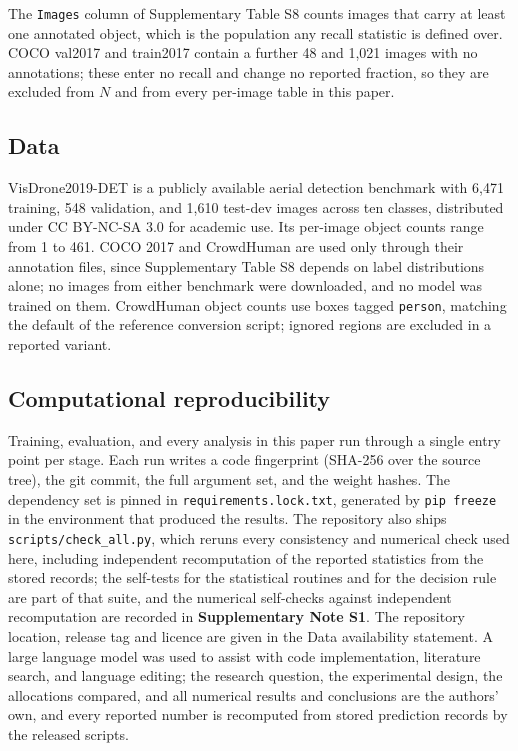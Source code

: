 \documentclass[sn-mathphys,Numbered]{sn-jnl}
\begin{document}
The \texttt{Images} column of Supplementary Table S8 counts images that carry at least one annotated object, which is the population any recall statistic is defined over. COCO val2017 and train2017 contain a further 48 and 1,021 images with no annotations; these enter no recall and change no reported fraction, so they are excluded from $N$ and from every per-image table in this paper.

\subsection{Data}

VisDrone2019-DET is a publicly available aerial detection benchmark with 6,471 training, 548 validation, and 1,610 test-dev images across ten classes, distributed under CC BY-NC-SA 3.0 for academic use. Its per-image object counts range from 1 to 461. COCO 2017 and CrowdHuman are used only through their annotation files, since Supplementary Table S8 depends on label distributions alone; no images from either benchmark were downloaded, and no model was trained on them. CrowdHuman object counts use boxes tagged \texttt{person}, matching the default of the reference conversion script; ignored regions are excluded in a reported variant.

\subsection{Computational reproducibility}

Training, evaluation, and every analysis in this paper run through a single entry point per stage. Each run writes a code fingerprint (SHA-256 over the source tree), the git commit, the full argument set, and the weight hashes. The dependency set is pinned in \texttt{requirements.lock.txt}, generated by \texttt{pip freeze} in the environment that produced the results. The repository also ships \texttt{scripts/check\_all.py}, which reruns every consistency and numerical check used here, including independent recomputation of the reported statistics from the stored records; the self-tests for the statistical routines and for the decision rule are part of that suite, and the numerical self-checks against independent recomputation are recorded in \textbf{Supplementary Note S1}. The repository location, release tag and licence are given in the Data availability statement. A large language model was used to assist with code implementation, literature search, and language editing; the research question, the experimental design, the allocations compared, and all numerical results and conclusions are the authors' own, and every reported number is recomputed from stored prediction records by the released scripts.
\end{document}
